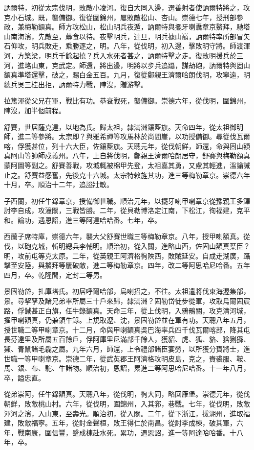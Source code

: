 \begin{pinyinscope}
訥爾特，初從太宗伐明，敗敵小凌河。復自大同入邊，選善射者使訥爾特將之，攻克小石城。既，襲備御。復從圍錦州，屢敗敵松山、杏山。崇德七年，授刑部參政，兼梅勒額真。師方攻松山，松山明兵夜遁，訥爾特與擺牙喇纛章京鰲拜，馳塔山南海濱，先敵至，蓐食以待。夜擊明兵，達旦，明兵據山巔，訥爾特率所部冒矢石仰攻，明兵敗走，乘勝逐之，明。八年，從伐明，初入邊，擊敗明守將。師渡渾河，方築梁，明兵千餘起撓？兵入水死者甚之，訥爾特擊之走。復敗明援兵於三河，進略山東，克武定。師還，將出邊，明將以步兵追躡，謀劫砲，訥爾特與固山額真準塔還擊，破之，賜白金五百。九月，復從鄭親王濟爾哈朗伐明，攻寧遠，明總兵吳三桂出拒，訥爾特力戰，陣沒，贈游擊。

拉篤渾從父兄在軍，戰比有功。恭袞戰死，襲備御。崇德六年，從伐明，圍錦州，陣沒，加半個前程。

舒賽，世居薩克達，以地為氏。歸太祖，隸滿洲鑲藍旗。天命四年，從太祖御明師，進二等參將。太宗即？與雅希禪等攻馬林於尚間崖，以功授備御。尋從伐瓦爾喀，俘獲甚位，列十六大臣，佐鑲藍旗。天聰元年，從伐朝鮮，師還，命與固山額真阿山等帥師戍義州。八年，上自將伐明，鄭親王濟爾哈朗居守，舒賽與梅勒額真蒙阿圖等副之。舒賽善戰，攻城輒被棉甲先登，太祖嘉其勇，又慮其輕進，溫諭誡止之。舒賽益感奮，先後克十六城。太宗特敕旌其功，進三等梅勒章京。崇德六年十月，卒。順治十二年，追謚壯敏。

子西蘭，初任牛錄章京，授備御世職。順治元年，以擺牙喇甲喇章京從豫親王多鐸討李自成，攻潼關，三戰皆勝。二年，從貝勒博洛定江南，下松江，徇福建，克平和。論功，遇恩詔，進三等阿達哈哈番。七年，卒。

西蘭子席特庫，崇德六年，襲大父舒賽世職三等梅勒章京。八年，授甲喇額真。從伐，以砲克城，斬明總兵李輔明。順治初，從入關，進略山西，佐固山額真葉臣？明，攻前屯等克太原。二年，從英親王阿濟格徇陜西，敗賊延安。自成走湖廣，躡擊至安陸，與鰲拜等屢破敵，進二等梅勒章京。四年，改二等阿思哈尼哈番。五年四月，卒。乾隆間，定封二等男。

景固勒岱，扎庫塔氏。初居呼爾哈部，烏喇招之，不往。太祖遣將伐東海渥集部，景。尋挈孥及諸兄弟率所屬三十戶來歸，隸滿洲？固勒岱徒步從軍，攻取烏爾固宸路，俘馘甚正白旗，任牛錄額真。天命三年，從上伐明，入鴉鶻關，攻克清河城，擢甲喇額真，仍兼領牛錄。上規取遼、沈，景固勒岱並在軍有功。天聰八年五月，授世職二等甲喇章京。十二月，命與甲喇額真吳巴海率兵四千伐瓦爾喀部，降其屯長芬達里及所屬五百餘戶，俘阿庫里尼滿部千餘人，獲貂、虎、狐、貉、猞猁猻、獺、青鼠諸毛毳之屬。九年六月，師還，上令禮部諸臣宴勞，以所獲分賚將士，進世職一等甲喇章京。崇德二年，從武英郡王阿濟格攻明皮島，克之，賚裘服、鞍、馬、銀、布、駝、牛諸物。順治初，恩詔，累進二等阿思哈尼哈番。十一年八月，卒，謚忠直。

從弟崇阿，任牛錄額真。天聰八年，從伐明，徇大同，略回雁堡。崇德元年，從伐朝鮮，敗敵桃山村。六年，從伐明，圍錦州，入其郛，巷戰。七年，從伐明，敗敵渾河之濱，入山東，至壽光。順治初，從入關。二年，從下浙江，拔湖州，進取福建，敗敵福寧。五年，從討金聲桓，敗王得仁於南昌。從討李成棟，破其軍，六年，戰南康，圍信豐，蹙成棟赴水死。累功，遇恩詔，進一等阿達哈哈番。十八年，卒。


\end{pinyinscope}
